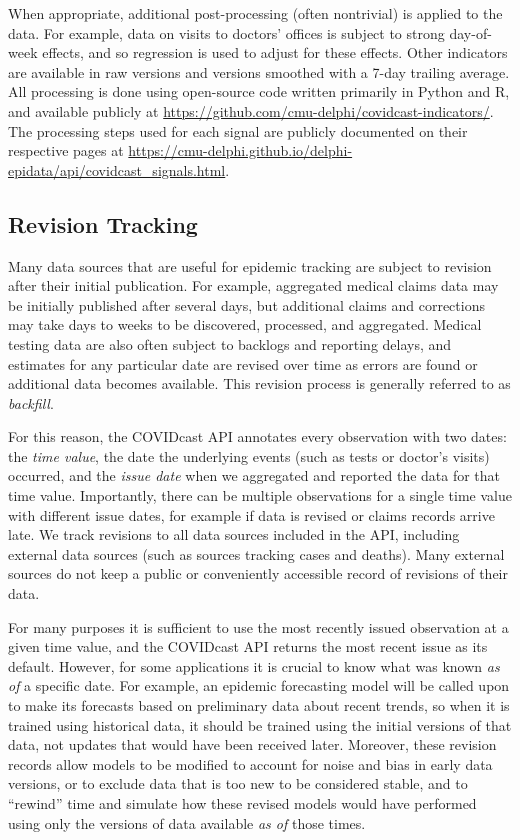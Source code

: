 \documentclass[9pt,twocolumn,twoside,lineno]{pnas-new}
\begin{document}
When appropriate, additional post-processing (often nontrivial) is applied to
the data. For example, data on visits to doctors' offices is subject to strong
day-of-week effects, and so regression is used to adjust for these effects.
Other indicators are available in raw versions and versions smoothed with a
7-day trailing average. All processing is done using open-source code written
primarily in Python and R, and available publicly at
\url{https://github.com/cmu-delphi/covidcast-indicators/}. The processing steps
used for each signal are publicly documented on their respective pages at
\url{https://cmu-delphi.github.io/delphi-epidata/api/covidcast_signals.html}.

\subsection{Revision Tracking}
\label{subsec:revision_tracking}

Many data sources that are useful for epidemic tracking are subject to revision
after their initial publication. For example, aggregated medical claims data may
be initially published after several days, but additional claims and corrections
may take days to weeks to be discovered, processed, and aggregated. Medical
testing data are also often subject to backlogs and reporting delays, and
estimates for any particular date are revised over time as errors are found or
additional data becomes available. This revision process is generally referred
to as \textit{backfill}.

For this reason, the COVIDcast API annotates every observation with two dates:
the \textit{time value}, the date the underlying events (such as tests or
doctor's visits) occurred, and the \textit{issue date} when we aggregated and
reported the data for that time value. Importantly, there can be multiple
observations for a single time value with different issue dates, for example if
data is revised or claims records arrive late. We track revisions to all data
sources included in the API, including external data sources (such as sources
tracking cases and deaths). Many external sources do not keep a public or
conveniently accessible record of revisions of their data.

For many purposes it is sufficient to use the most recently issued observation
at a given time value, and the COVIDcast API returns the most recent issue as
its default. However, for some applications it is crucial to know what was known
\textit{as of} a specific date. For example, an epidemic forecasting model will
be called upon to make its forecasts based on preliminary data about recent
trends, so when it is trained using historical data, it should be trained using
the initial versions of that data, not updates that would have been received
later. Moreover, these revision records allow models to be modified to account
for noise and bias in early data versions, or to exclude data that is too new to
be considered stable, and to ``rewind'' time and simulate how these revised
models would have performed using only the versions of data available \textit{as
  of} those times.
\end{document}
